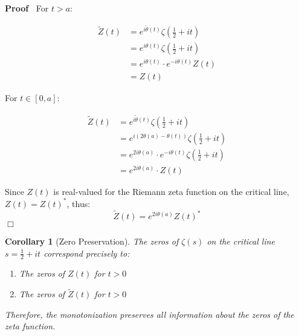 \documentclass{article}
\newenvironment{proof}{\noindent\textbf{Proof\ }}{\hspace*{\fill}$\Box$\medskip}
\newtheorem{corollary}{Corollary}
\begin{document}
\begin{proof}
  For $t > a$:
  
  \begin{align}
    \tilde{Z} (t) & = e^{i \tilde{\theta} (t)} \zeta \left( \frac{1}{2} + it
    \right) \\
    & = e^{i \theta (t)} \zeta \left( \frac{1}{2} + it \right) \\
    & = e^{i \theta (t)} \cdot e^{- i \theta (t)} Z (t) \\
    & = Z (t) 
  \end{align}
  
  For $t \in [0, a]$:
  
  \begin{align}
    \tilde{Z} (t) & = e^{i \tilde{\theta} (t)} \zeta \left( \frac{1}{2} + it
    \right) \\
    & = e^{i (2 \theta (a) - \theta (t))} \zeta \left( \frac{1}{2} + it
    \right) \\
    & = e^{2 i \theta (a)} \cdot e^{- i \theta (t)} \zeta \left( \frac{1}{2}
    + it \right) \\
    & = e^{2 i \theta (a)} \cdot Z (t) 
  \end{align}
  
  Since $Z (t)$ is real-valued for the Riemann zeta function on the critical
  line, $Z (t) = Z (t)^{\ast}$, thus:
  \begin{equation}
    \tilde{Z} (t) = e^{2 i \theta (a)} Z (t)^{\ast}
  \end{equation}
\end{proof}

\begin{corollary}[Zero Preservation]
  The zeros of $\zeta (s)$ on the critical line $s = \frac{1}{2} + it$
  correspond precisely to:
  \begin{enumerate}
    \item The zeros of $Z (t)$ for $t > 0$
    
    \item The zeros of $\tilde{Z} (t)$ for $t > 0$
  \end{enumerate}
  Therefore, the monotonization preserves all information about the zeros of
  the zeta function.
\end{corollary}
\end{document}
